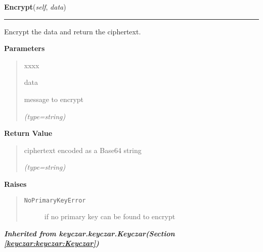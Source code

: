 \hspace{.8\funcindent}\begin{boxedminipage}{\funcwidth}

    \raggedright \textbf{Encrypt}(\textit{self}, \textit{data})

    \vspace{-1.5ex}

    \rule{\textwidth}{0.5\fboxrule}
\setlength{\parskip}{2ex}
    Encrypt the data and return the ciphertext.

\setlength{\parskip}{1ex}
      \textbf{Parameters}
      \vspace{-1ex}

      \begin{quote}
        \begin{Ventry}{xxxx}

          \item[data]

          message to encrypt

            {\it (type=string)}

        \end{Ventry}

      \end{quote}

      \textbf{Return Value}
    \vspace{-1ex}

      \begin{quote}
      ciphertext encoded as a Base64 string

      {\it (type=string)}

      \end{quote}

      \textbf{Raises}
    \vspace{-1ex}

      \begin{quote}
        \begin{description}

          \item[\texttt{NoPrimaryKeyError}]

          if no primary key can be found to encrypt

        \end{description}

      \end{quote}

    \end{boxedminipage}


\large{\textbf{\textit{Inherited from keyczar.keyczar.Keyczar\textit{(Section \ref{keyczar:keyczar:Keyczar})}}}}

